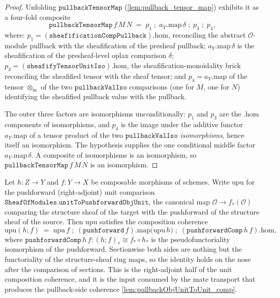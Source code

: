 \begin{proof}
  \leanok
  Unfolding \(\mathtt{pullbackTensorMap}\) (\cref{lem:pullback_tensor_map}) exhibits it as a
  four-fold composite
  \[
    \mathtt{pullbackTensorMap}\,f\,M\,N
      \;=\;
    p_1 \;\mathbin{;}\; a_Y.\mathrm{map}\,\delta \;\mathbin{;}\; p_3 \;\mathbin{;}\; p_4,
  \]
  where:
  \(p_1 = (\mathtt{sheafificationCompPullback}).\mathrm{hom}\), reconciling the abstract
  \(\mathcal{O}\)-module pullback with the sheafification of the presheaf pullback;
  \(a_Y.\mathrm{map}\,\delta\) is the sheafification of the presheaf-level oplax comparison
  \(\delta\); \(p_3 = (\mathtt{sheafifyTensorUnitIso}).\mathrm{hom}\), the
  sheafification-monoidality brick reconciling the sheafified tensor with the sheaf tensor;
  and \(p_4 = a_Y.\mathrm{map}\) of the tensor \(\otimes_{\mathrm{m}}\) of the two
  \(\mathtt{pullbackValIso}\) comparisons (one for \(M\), one for \(N\)) identifying the
  sheafified pullback value with the pullback.

  The outer three factors are isomorphisms unconditionally: \(p_1\) and \(p_3\) are the
  \(.\mathrm{hom}\) components of isomorphisms, and \(p_4\) is the image under the additive
  functor \(a_Y.\mathrm{map}\) of a tensor product of the two \(\mathtt{pullbackValIso}\)
  \emph{isomorphisms}, hence itself an isomorphism. The hypothesis supplies the one
  conditional middle factor \(a_Y.\mathrm{map}\,\delta\). A composite of isomorphisms is an
  isomorphism, so \(\mathtt{pullbackTensorMap}\,f\,M\,N\) is an isomorphism.
\end{proof}

\begin{lemma}\leanok
  \label{lem:unitToPushforwardObjUnit_comp}
  Let \(h : Z \to Y\) and \(f : Y \to X\) be composable morphisms of schemes. Write
  \(\mathrm{upu}\) for the pushforward (right-adjoint) unit comparison
  \(\mathtt{SheafOfModules.unitToPushforwardObjUnit}\), the canonical map
  \(\mathcal{O} \to f_*(\mathcal{O})\) comparing the structure sheaf of the target with
  the pushforward of the structure sheaf of the source. Then \(\mathrm{upu}\) satisfies
  the composition coherence
  \[
    \mathrm{upu}(h \mathbin{;} f)
      \;=\;
    \mathrm{upu}\,f \;\mathbin{;}\;
      (\mathtt{pushforward}\,f).\mathrm{map}\bigl(\mathrm{upu}\,h\bigr) \;\mathbin{;}\;
      (\mathtt{pushforwardComp}\,h\,f).\mathrm{hom},
  \]
  where \(\mathtt{pushforwardComp}\,h\,f : (h \mathbin{;} f)_* \cong f_* \circ h_*\) is the
  pseudofunctoriality isomorphism of the pushforward. Sectionwise both sides are nothing
  but the functoriality of the structure-sheaf ring maps, so the identity holds on the
  nose after the comparison of sections. This is the right-adjoint half of the unit
  composition coherence, and it is the input consumed by the mate transport that produces
  the pullback-side coherence \cref{lem:pullbackObjUnitToUnit_comp}.
\end{lemma}

